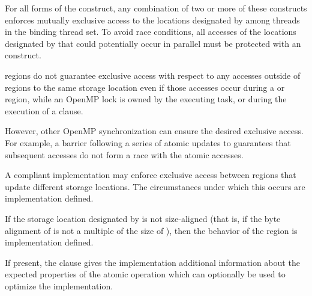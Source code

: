 For all forms of the  construct, any combination of two or more
of these  constructs enforces mutually exclusive access to the
locations designated by  among threads in the binding thread set.  To
avoid race conditions, all accesses of the locations designated by 
that could potentially occur in parallel must be protected with an
 construct. 

 regions do not guarantee exclusive access with respect to any accesses outside 
of  regions to the same storage location  even if those accesses occur during a 
 or  region, while an OpenMP lock is owned by the executing 
task, or during the execution of a  clause.

However, other OpenMP synchronization can ensure the desired exclusive access. For 
example, a barrier following a series of atomic updates to  guarantees that subsequent 
accesses do not form a race with the atomic accesses. 

A compliant implementation may enforce exclusive access between  regions 
that update different storage locations. The circumstances under which this occurs are 
implementation defined. 

If the storage location designated by  is not size-aligned (that is, if the byte alignment 
of  is not a multiple of the size of ), then the behavior of the  region is 
implementation defined.

If present, the \code{)} clause gives the implementation additional
information about the expected properties of the atomic operation
which can optionally be used to optimize the implementation. 

